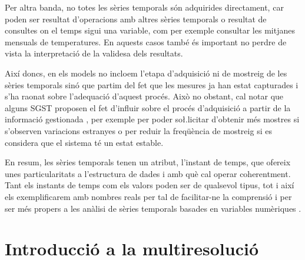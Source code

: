 
Per altra banda, no totes les sèries temporals són adquirides
directament, car poden ser resultat d'operacions amb altres sèries
temporals o resultat de consultes on el temps sigui una variable, com
per exemple consultar les mitjanes mensuals de temperatures. %
En aquests casos també és important no perdre de vista la
interpretació de la validesa dels resultats.




Així doncs, en els models no incloem l'etapa d'adquisició ni de
mostreig de les sèries temporals sinó que partim del fet que les
mesures ja han estat capturades i s'ha raonat sobre l'adequació
d'aquest procés. Això no obstant, cal notar que alguns \gls{SGST}
proposen el fet d'influir sobre el procés d'adquisició a partir de la
informació gestionada \parencite{madden05}, per exemple per poder
so\l.licitar d'obtenir més mostres si s'observen variacions estranyes
o per reduir la freqüència de mostreig si es considera que el sistema
té un estat estable.






En resum, les sèries temporals tenen un atribut, l'instant de temps,
que ofereix unes particularitats a l'estructura de dades i amb què cal
operar coherentment. Tant els instants de temps com els valors poden
ser de qualsevol tipus, tot i així els exemplificarem amb nombres
reals per tal de facilitar-ne la comprensió i per ser més propers a
les anàlisi de sèries temporals basades en variables
numèriques \parencite{last04:book}.








\section{Introducció a la multiresolució}

